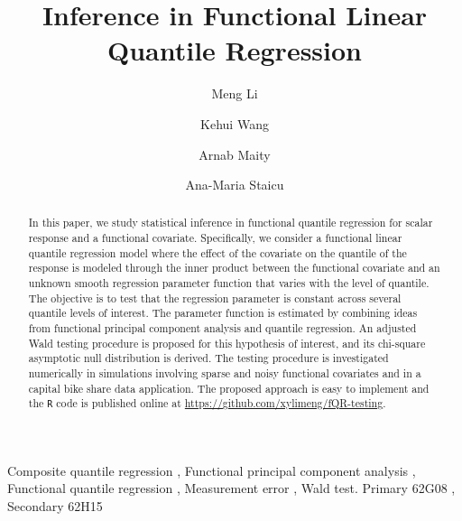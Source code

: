 \documentclass[times,sort&compress,3p]{elsarticle}
\date{}
\theoremstyle{plain}%
\theoremstyle{definition}
\begin{document}
\begin{frontmatter}

\title{Inference in Functional Linear Quantile Regression}

\author[1]{Meng Li}
\author[2]{Kehui Wang}
\author[3]{Arnab Maity}
\author[3]{Ana-Maria Staicu}

\address[1]{Department of Statistics, Rice University, Houston, TX}
\address[2]{PPD Inc, Morrisville, NC}
\address[3]{Department of Statistics, North Carolina State University, Raleigh, NC}




\begin{abstract}
In this paper, we study statistical inference in functional quantile regression for scalar response and a functional covariate. Specifically, we consider a functional linear quantile regression model where the effect of the covariate on the quantile of the response is modeled through the inner product between the functional covariate and an unknown smooth regression parameter function that varies with the level of quantile. The objective is to test that the regression parameter is constant across several quantile levels of interest. The parameter function is estimated by combining ideas from functional principal component analysis and quantile regression. An adjusted Wald testing procedure is proposed for this hypothesis of interest, and its chi-square asymptotic null distribution is derived. The testing procedure is investigated numerically in simulations involving sparse and noisy functional covariates and in a capital bike share data application. The proposed approach is easy to implement and the {\tt R} code is published online at \url{https://github.com/xylimeng/fQR-testing}. 
\end{abstract}


\begin{keyword} %
Composite quantile regression \sep 
Functional principal component analysis \sep
Functional quantile regression \sep
Measurement error \sep 
Wald test. 
\MSC[2020] Primary 62G08 \sep
Secondary 62H15
\end{keyword}
\end{frontmatter}
\end{document}

